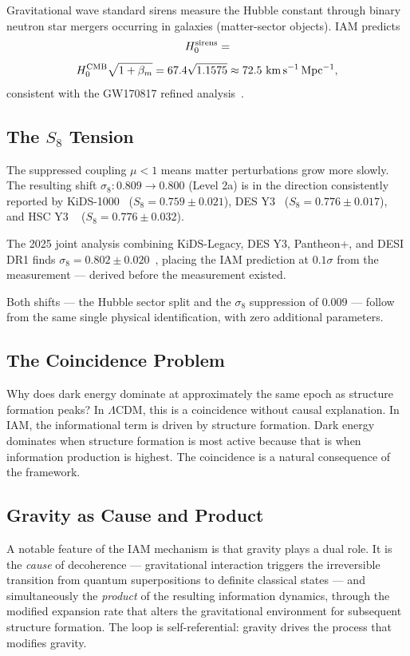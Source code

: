 \documentclass[twocolumn,a4paper,aps,prd,twocolumn,showpacs,notitlepage,superscriptaddress,nofootinbib]{article}
\newcommand{\LCDM}{$\Lambda$CDM}
\newcommand{\betam}{\beta_{m}}
\begin{document}
Gravitational wave standard sirens measure the Hubble constant through binary
neutron star mergers occurring in galaxies (matter-sector objects).  IAM
predicts $$H_0^{\rm sirens} = $$
\begin{equation}
H_0^{\rm CMB}\sqrt{1+\betam} = 67.4\sqrt{1.1575}
  \approx 72.5~\rm km\,s^{-1}\,Mpc^{-1},
\end{equation}
consistent with the GW170817 refined
analysis~\citep{Abbott2017,Nicolaou2023}.

\subsection{The $S_8$ Tension}

The suppressed coupling $\mu < 1$ means matter perturbations grow more slowly.
The resulting shift $\sigma_8: 0.809 \to 0.800$ (Level 2a) is in the direction
consistently reported by KiDS-1000~\citep{Heymans2021} ($S_8 = 0.759 \pm
0.021$), DES Y3~\citep{DES2022} ($S_8 = 0.776 \pm 0.017$), and HSC Y3
~\citep{Li2023} ($S_8 = 0.776 \pm 0.032$).

The 2025 joint analysis combining KiDS-Legacy, DES Y3, Pantheon+, and
DESI DR1 finds $\sigma_8 = 0.802 \pm 0.020$~\citep{Stolzner2025}, placing
the IAM prediction at $0.1\sigma$ from the measurement --- derived before
the measurement existed.

Both shifts --- the Hubble sector split and the $\sigma_8$ suppression of
$0.009$ --- follow from the same single physical identification, with zero
additional parameters.

\subsection{The Coincidence Problem}

Why does dark energy dominate at approximately the same epoch as structure
formation peaks?  In \LCDM{}, this is a coincidence without causal
explanation.  In IAM, the informational term is driven by structure formation.
Dark energy dominates when structure formation is most active because that is
when information production is highest.  The coincidence is a natural consequence of the framework.

\subsection{Gravity as Cause and Product}

A notable feature of the IAM mechanism is that gravity plays a dual role.
It is the \textit{cause} of decoherence --- gravitational interaction triggers
the irreversible transition from quantum superpositions to definite classical
states --- and simultaneously the \textit{product} of the resulting information
dynamics, through the modified expansion rate that alters the gravitational
environment for subsequent structure formation.  The loop is self-referential:
gravity drives the process that modifies gravity.
\end{document}
